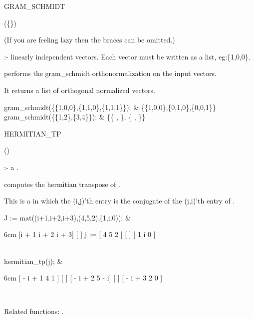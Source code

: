 \begin{Operator}[gramschmidt]{GRAM_SCHMIDT}

\begin{Syntax}
(\{\}) 
\end{Syntax}

(If you are feeling lazy then the braces can be omitted.)

 :- linearly independent vectors. Each vector must be 
written as a list, eg:\{1,0,0\}. 

 performs the gram\_schmidt orthonormalization on
the input vectors. 

It returns a list of orthogonal normalized vectors.

\begin{Examples}

gram_schmidt(\{\{1,0,0\},\{1,1,0\},\{1,1,1\}\}); &
\{\{1,0,0\},\{0,1,0\},\{0,0,1\}\} \\

gram_schmidt(\{\{1,2\},\{3,4\}\}); &
\{\{  ,  \},
\{  ,  \}\}

\end{Examples}

\end{Operator}


\begin{Operator}[hermitiantp]{HERMITIAN_TP}

\begin{Syntax}
()
\end{Syntax}

 :- a . 

 computes the hermitian transpose of . 

This is a  in which the (i,j)'th entry is the conjugate
of the (j,i)'th entry of . 

\begin{Examples}

J := mat((i+1,i+2,i+3),(4,5,2),(1,i,0)); &
\begin{multilineoutput}{6cm}
     [i + 1  i + 2  i + 3]
     [                   ]
j := [  4      5      2  ]
     [                   ]
     [  1      i      0  ]
\end{multilineoutput} \\

hermitian_tp(j); &
\begin{multilineoutput}{6cm}
[ - i + 1  4   1  ]
[                 ]
[ - i + 2  5   - i]
[                 ]
[ - i + 3  2   0  ]
\end{multilineoutput} \\

\end{Examples}

Related functions:
.

\end{Operator}


